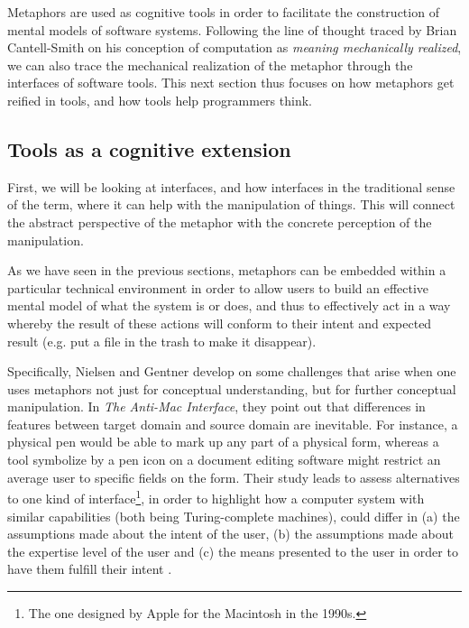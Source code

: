 \spacer

Metaphors are used as cognitive tools in order to facilitate the construction of mental models of software systems. Following the line of thought traced by Brian Cantell-Smith on his conception of computation as \emph{meaning mechanically realized}, we can also trace the mechanical realization of the metaphor through the interfaces of software tools. This next section thus focuses on how metaphors get reified in tools, and how tools help programmers think.

\subsection{Tools as a cognitive extension}
\label{subsec:tools-cognition}

First, we will be looking at interfaces, and how interfaces in the traditional sense of the term, where it can help with the manipulation of things. This will connect the abstract perspective of the metaphor with the concrete perception of the manipulation.

As we have seen in the previous sections, metaphors can be embedded within a  particular technical environment in order to allow users to build an effective mental model of what the system is or does, and thus to effectively act in  a way whereby the result of these actions will conform to their intent and expected result (e.g. put a file in the trash to make it disappear).

Specifically, Nielsen and Gentner develop on some challenges that arise when one uses metaphors not just for conceptual understanding, but for further conceptual manipulation. In \emph{The Anti-Mac Interface}, they point out that differences in features between target domain and source domain are inevitable. For instance, a physical pen would be able to mark up any part of a physical form, whereas a tool symbolize by a pen icon on a document editing software might restrict an average user to specific fields on the form. Their study leads to assess alternatives to one kind of interface\footnote{The one designed by Apple for the Macintosh in the 1990s.}, in order to highlight how a computer system with similar capabilities (both being Turing-complete machines), could differ in (a) the assumptions made about the intent of the user, (b) the assumptions made about the expertise level of the user and (c) the means presented to the user in order to have them fulfill their intent \citep{gentner_antimac_1996}.

